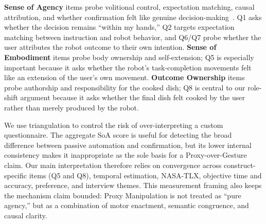 \documentclass[sigconf,review,anonymous]{acmart}
\begin{document}
\textbf{Sense of Agency} items probe volitional control, expectation matching, causal attribution, and whether confirmation felt like genuine decision-making~\cite{tapal2017sense}. Q1 asks whether the decision remains ``within my hands,'' Q2 targets expectation matching between instruction and robot behavior, and Q6/Q7 probe whether the user attributes the robot outcome to their own intention. \textbf{Sense of Embodiment} items probe body ownership and self-extension; Q5 is especially important because it asks whether the robot's task-completion movements felt like an extension of the user's own movement. \textbf{Outcome Ownership} items probe authorship and responsibility for the cooked dish; Q8 is central to our role-shift argument because it asks whether the final dish felt cooked by the user rather than merely produced by the robot.

We use triangulation to control the risk of over-interpreting a custom questionnaire. The aggregate SoA score is useful for detecting the broad difference between passive automation and confirmation, but its lower internal consistency makes it inappropriate as the sole basis for a Proxy-over-Gesture claim. Our main interpretation therefore relies on convergence across construct-specific items (Q5 and Q8), temporal estimation, NASA-TLX, objective time and accuracy, preference, and interview themes. This measurement framing also keeps the mechanism claim bounded: Proxy Manipulation is not treated as ``pure agency,'' but as a combination of motor enactment, semantic congruence, and causal clarity.


\end{document}
